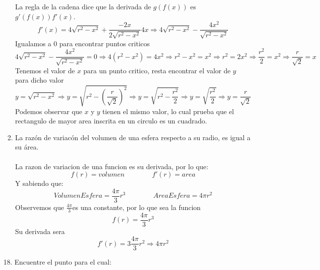 \documentclass[12pt]{article}
\begin{document}
\begin{enumerate}[\hspace{9px} a)]
    La regla de la cadena dice que la derivada de \(g(f(x))\) es \(g'(f(x))f'(x)\).
    \[f'(x)=4\sqrt{r^2-x^2}+\displaystyle\frac{-2x}{2\sqrt{r^2-x^2}}4x\Rightarrow 4\sqrt{r^2-x^2}-\displaystyle\frac{4x^2}{\sqrt{r^2-x^2}}\]
    Igualamos a 0 para encontrar puntos criticos
    \[4\sqrt{r^2-x^2}-\displaystyle\frac{4x^2}{\sqrt{r^2-x^2}}=0\Rightarrow 4(r^2-x^2)=4x^2\Rightarrow r^2-x^2=x^2\Rightarrow r^2=2x^2\Rightarrow \displaystyle\frac{r^2}{2}=x^2\Rightarrow \displaystyle\frac{r}{\sqrt{2}}=x\] 
    Tenemos el valor de \(x\) para un punto critico, resta encontrar el valor de \(y\) para dicho valor
    \[y=\sqrt{r^2-x^2}\Rightarrow y=\sqrt{r^2-(\displaystyle\frac{r}{\sqrt{2}})^2}\Rightarrow y=\sqrt{r^2-\displaystyle\frac{r^2}{2}}\Rightarrow y=\sqrt{\displaystyle\frac{r^2}{2}}\Rightarrow y=\displaystyle\frac{r}{\sqrt{2}}\] 
    Podemos observar que \(x\) y \(y\) tienen el mismo valor, lo cual prueba que el rectangulo de mayor area inscrita en un circulo es un cuadrado.
    \item La raz\'on de variac\'on del volumen de una esfera respecto a su radio, es igual a su \'area.\\ \\
    La razon de variacion de una funcion es su derivada, por lo que: 
    \[f(r)=volumen \qquad \qquad f'(r)=area\]
    Y sabiendo que:
    \[Volumen Esfera=\displaystyle\frac{4\pi}{3}r^3\qquad \qquad Area Esfera=4\pi r^2\]
    Observemos que \(\displaystyle\frac{4\pi}{3}\)es una constante, por lo que sea la funcion
    \[f(r)=\displaystyle\frac{4\pi}{3}r^3\]
    Su derivada sera
    \[f'(r)=3\displaystyle\frac{4\pi}{3}r^2\Rightarrow 4\pi r^2\]
\end{enumerate}

18. Encuentre el punto para el cual:
\end{document}
